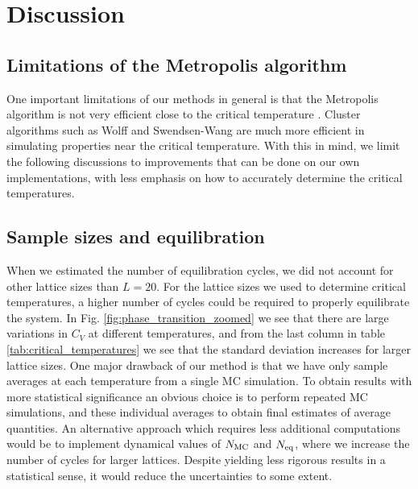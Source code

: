 \section{Discussion}\label{sec:discussion}
\subsection{Limitations of the Metropolis algorithm}
One important limitations of our methods in general is that the Metropolis algorithm is not very efficient close to the critical temperature \cite{lecture_notes}. Cluster algorithms such as Wolff and Swendsen-Wang are much more efficient in simulating properties near the critical temperature. With this in mind, we limit the following discussions to improvements that can be done on our own implementations, with less emphasis on how to accurately determine the critical temperatures. 

\subsection{Sample sizes and equilibration}
When we estimated the number of equilibration cycles, we did not account for other lattice sizes than $L=20$. For the lattice sizes we used to determine critical temperatures, a higher number of cycles could be required to properly equilibrate the system. In Fig. \ref{fig:phase_transition_zoomed} we see that there are large variations in $C_V$ at different temperatures, and from the last column in table \ref{tab:critical_temperatures} we see that the standard deviation increases for larger lattice sizes. One major drawback of our method is that we have only sample averages at each temperature from a single MC simulation. To obtain results with more statistical significance an obvious choice is to perform repeated MC simulations, and these individual averages to obtain final estimates of average quantities. An alternative approach which requires less additional computations would be to implement dynamical values of $N_\mathrm{MC}$ and $N_\mathrm{eq}$, where we increase the number of cycles for larger lattices. Despite yielding less rigorous results in a statistical sense, it would reduce the uncertainties to some extent.  


